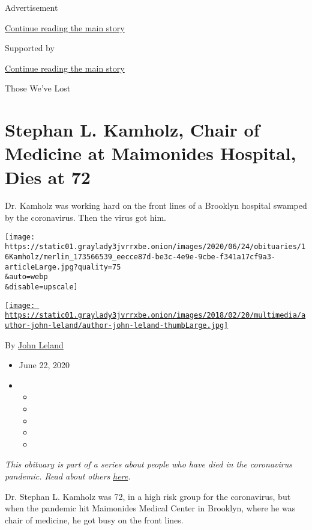 Advertisement

\protect\hyperlink{after-top}{Continue reading the main story}

Supported by

\protect\hyperlink{after-sponsor}{Continue reading the main story}

Those We've Lost

\hypertarget{stephan-l-kamholz-chair-of-medicine-at-maimonides-hospital-dies-at-72}{%
\section{Stephan L. Kamholz, Chair of Medicine at Maimonides Hospital,
Dies at
72}\label{stephan-l-kamholz-chair-of-medicine-at-maimonides-hospital-dies-at-72}}

Dr. Kamholz was working hard on the front lines of a Brooklyn hospital
swamped by the coronavirus. Then the virus got him.

\texttt{[image: https://static01.graylady3jvrrxbe.onion/images/2020/06/24/obituaries/16Kamholz/merlin\_173566539\_eecce87d-be3c-4e9e-9cbe-f341a17cf9a3-articleLarge.jpg?quality=75\\\&auto=webp\\\&disable=upscale]}

\href{https://www.nytimes3xbfgragh.onion/by/john-leland}{\texttt{[image: https://static01.graylady3jvrrxbe.onion/images/2018/02/20/multimedia/author-john-leland/author-john-leland-thumbLarge.jpg]}}

By \href{https://www.nytimes3xbfgragh.onion/by/john-leland}{John Leland}

\begin{itemize}
\item
  June 22, 2020
\item
  \begin{itemize}
  \item
  \item
  \item
  \item
  \item
  \end{itemize}
\end{itemize}

\emph{This obituary is part of a series about people who have died in
the coronavirus pandemic. Read about others}
\href{https://www.nytimes3xbfgragh.onion/interactive/2020/obituaries/people-died-coronavirus-obituaries.html}{\emph{here}}\emph{.}

Dr. Stephan L. Kamholz was 72, in a high risk group for the coronavirus,
but when the pandemic hit Maimonides Medical Center in Brooklyn, where
he was chair of medicine, he got busy on the front lines.

